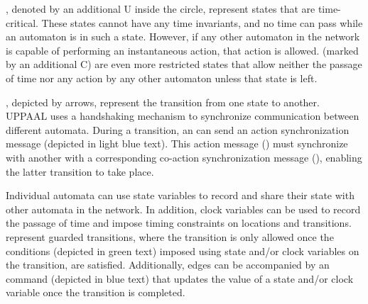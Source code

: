 \par
{}, denoted by an additional U inside the circle, represent states that are time-critical. These states cannot have any time invariants, and no time can pass while an automaton is in such a state. However, if any other automaton in the network is capable of performing an instantaneous action, that action is allowed.  (marked by an additional C) are even more restricted states that allow neither the passage of time nor any action by any other automaton unless that state is left.
\par
{}, depicted by arrows, represent the transition from one state to another. UPPAAL uses a handshaking mechanism to synchronize communication between different automata. During a transition, an  can send an action synchronization message (depicted in light blue text). This action message () must synchronize with another  with a corresponding co-action synchronization message (), enabling the latter transition to take place.
\par
Individual automata can use state variables to record and share their state with other automata in the network. In addition, clock variables can be used to record the passage of time and impose timing constraints on locations and transitions.  represent guarded transitions, where the transition is only allowed once the conditions (depicted in green text) imposed using state and/or clock variables on the transition, are satisfied. Additionally, edges can be accompanied by an  command (depicted in blue text) that updates the value of a state and/or clock variable once the transition is completed.
\par